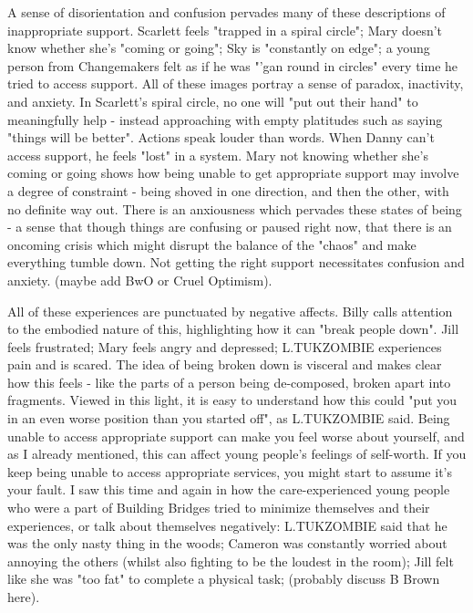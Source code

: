 A sense of disorientation and confusion pervades many of these descriptions of inappropriate support. Scarlett feels "trapped in a spiral circle"; Mary doesn't know whether she's "coming or going"; Sky is "constantly on edge"; a young person from Changemakers felt as if he was "'gan round in circles" every time he tried to access support. All of these images portray a sense of paradox, inactivity, and anxiety. In Scarlett's spiral circle, no one will "put out their hand" to meaningfully help - instead approaching with empty platitudes such as saying "things will be better". Actions speak louder than words. When Danny can't access support, he feels "lost" in a system. Mary not knowing whether she's coming or going shows how being unable to get appropriate support may involve a degree of constraint - being shoved in one direction, and then the other, with no definite way out. There is an anxiousness which pervades these states of being - a sense that though things are confusing or paused right now, that there is an oncoming crisis which might disrupt the balance of the "chaos" and make everything tumble down. Not getting the right support necessitates confusion and anxiety. (maybe add BwO or Cruel Optimism).

All of these experiences are punctuated by negative affects. Billy calls attention to the embodied nature of this, highlighting how it can "break people down". Jill feels frustrated; Mary feels angry and depressed; L.TUKZOMBIE experiences pain and is scared. The idea of being broken down is visceral and makes clear how this feels - like the parts of a person being de-composed, broken apart into fragments. Viewed in this light, it is easy to understand how this could "put you in an even worse position than you started off", as L.TUKZOMBIE said. Being unable to access appropriate support can make you feel worse about yourself, and as I already mentioned, this can affect young people's feelings of self-worth. If you keep being unable to access appropriate services, you might start to assume it's your fault. I saw this time and again in how the care-experienced young people who were a part of Building Bridges tried to minimize themselves and their experiences, or talk about themselves negatively: L.TUKZOMBIE said that he was the only nasty thing in the woods; Cameron was constantly worried about annoying the others (whilst also fighting to be the loudest in the room); Jill felt like she was "too fat" to complete a physical task; (probably discuss B Brown here).

